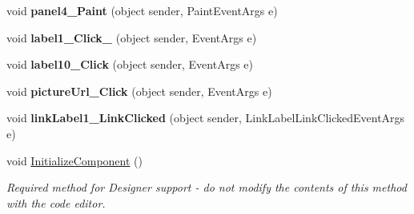 \begin{DoxyCompactItemize}
void {\bfseries panel4\+\_\+\+Paint} (object sender, Paint\+Event\+Args e)
\item 
\mbox{\label{class_pogodynka__w57003_1_1panel__glony_a1f498dbb0ba257e63334a0d87cb72f79}} 
void {\bfseries label1\+\_\+\+Click\+\_} (object sender, Event\+Args e)
\item 
\mbox{\label{class_pogodynka__w57003_1_1panel__glony_ad5bd9cb20a1da128d7619ece256bf1da}} 
void {\bfseries label10\+\_\+\+Click} (object sender, Event\+Args e)
\item 
\mbox{\label{class_pogodynka__w57003_1_1panel__glony_a512774a6ab3e7e1623c74b06142ea0f3}} 
void {\bfseries picture\+Url\+\_\+\+Click} (object sender, Event\+Args e)
\item 
\mbox{\label{class_pogodynka__w57003_1_1panel__glony_a01e97cdfb5fcadcdf709d4055c9aa565}} 
void {\bfseries link\+Label1\+\_\+\+Link\+Clicked} (object sender, Link\+Label\+Link\+Clicked\+Event\+Args e)
\item 
void \mbox{\hyperlink{class_pogodynka__w57003_1_1panel__glony_a611ee70952200993f8066c71042452de}{Initialize\+Component}} ()
\begin{DoxyCompactList}\small\item\em Required method for Designer support -\/ do not modify the contents of this method with the code editor. \end{DoxyCompactList}\end{DoxyCompactItemize}
